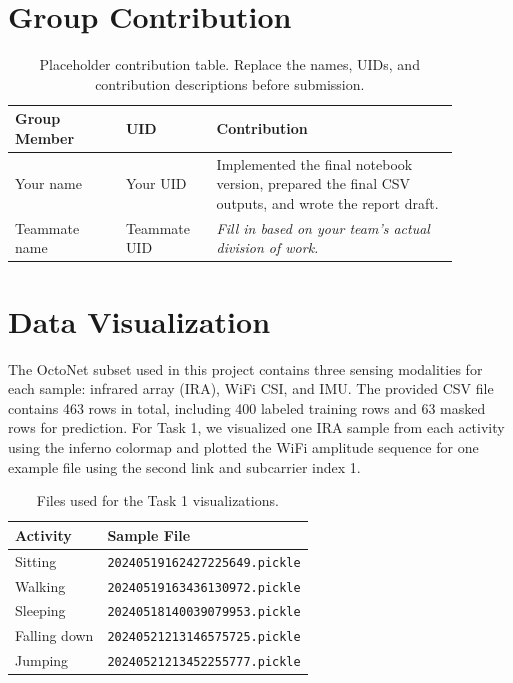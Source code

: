 \section{Group Contribution}
\begin{table}[H]
\centering
\small
\begin{tabular}{p{0.22\linewidth}p{0.18\linewidth}p{0.48\linewidth}}
\toprule
\textbf{Group Member} & \textbf{UID} & \textbf{Contribution} \\
\midrule
Your name & Your UID & Implemented the final notebook version, prepared the final CSV outputs, and wrote the report draft. \\
Teammate name & Teammate UID & \textit{Fill in based on your team's actual division of work.} \\
\bottomrule
\end{tabular}
\caption{Placeholder contribution table. Replace the names, UIDs, and contribution descriptions before submission.}
\label{tab:contribution}
\end{table}

\section{Data Visualization}
The OctoNet subset used in this project contains three sensing modalities for each sample: infrared array (IRA), WiFi CSI, and IMU. The provided CSV file contains 463 rows in total, including 400 labeled training rows and 63 masked rows for prediction. For Task 1, we visualized one IRA sample from each activity using the inferno colormap and plotted the WiFi amplitude sequence for one example file using the second link and subcarrier index 1.

\begin{table}[H]
\centering
\small
\begin{tabular}{ll}
\toprule
\textbf{Activity} & \textbf{Sample File} \\
\midrule
Sitting & \texttt{20240519162427225649.pickle} \\
Walking & \texttt{20240519163436130972.pickle} \\
Sleeping & \texttt{20240518140039079953.pickle} \\
Falling down & \texttt{20240521213146575725.pickle} \\
Jumping & \texttt{20240521213452255777.pickle} \\
\bottomrule
\end{tabular}
\caption{Files used for the Task 1 visualizations.}
\label{tab:task1-files}
\end{table}

